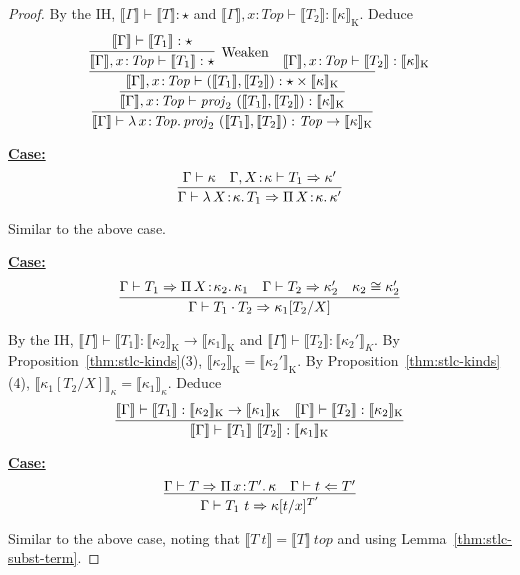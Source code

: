 \documentclass{article}
\newcommand{\abs}[4]{{#1}\, #2\! : \! #3.\, #4}
\newcommand{\interp}[1]{\llbracket #1 \rrbracket}
\newcommand{\tpcheck}[0]{\Leftarrow}
\newcommand{\tpsynth}[0]{\Rightarrow}
\newcommand{\startcase}[1]{\vspace{#1} \noindent\textbf{\underline{Case:}}}
\begin{document}
\begin{proof}
  By the IH,
  \(\interp{\Gamma} \vdash \interp{T} : \star\)
  and \(\interp{\Gamma},x\!:\!\mathit{Top} \vdash \interp{T_2} :
  \interp{\kappa}_{\text{K}}\).
  Deduce
  \[
    \infer{
      \interp{\Gamma}
      \vdash \abs{\lambda}{x}{\mathit{Top}}{\mathit{proj}_2\ (\interp{T_1},\interp{T_2})}
      : \mathit{Top} \to \interp{\kappa}_{\text{K}}
    }{
      \infer{
        \interp{\Gamma},x\!:\!\mathit{Top}
        \vdash \mathit{proj}_2\ (\interp{T_1},\interp{T_2})
        : \interp{\kappa}_{\text{K}}
      }{
        \infer{
          \interp{\Gamma},x\!:\!\mathit{Top}
          \vdash (\interp{T_1},\interp{T_2})
          : \star \times \interp{\kappa}_{\text{K}}
        }{
          \infer[\text{Weaken}]{
            \interp{\Gamma},x\!:\!\mathit{Top}
            \vdash \interp{T_1}
            : \star
          }{
            \interp{\Gamma}
            \vdash \interp{T_1}
            : \star
          }
            \quad
            \interp{\Gamma},x\!:\!\mathit{Top}
            \vdash \interp{T_2}
            : \interp{\kappa}_{\text{K}}
          }
        }
      }
  \]

  \startcase{.2cm}
  \[
    \infer{
      \Gamma \vdash \abs{\lambda}{X}{\kappa}{T_1} \tpsynth \abs{\Pi}{X}{\kappa}{\kappa'}
    }{
      \Gamma \vdash \kappa
      \quad \Gamma,X\!:\!\kappa \vdash T_1 \tpsynth \kappa'
    }
  \]

  Similar to the above case.

  \startcase{.2cm}
  \[
    \infer{
      \Gamma \vdash T_1 \cdot T_2 \tpsynth \kappa_1[T_2/X]
    }{
      \Gamma \vdash T_1 \tpsynth \abs{\Pi}{X}{\kappa_2}{\kappa_1}
      \quad \Gamma \vdash T_2 \tpsynth \kappa_2'
      \quad \kappa_2 \cong \kappa_2'
    }
  \]

  By the IH, \(\interp{\Gamma} \vdash \interp{T_1} : \interp{\kappa_2}_{\text{K}} \to
  \interp{\kappa_1}_{\text{K}}\)
  and \(\interp{\Gamma} \vdash \interp{T_2} : \interp{\kappa_2'}_{K}\).
  By Proposition~\ref{thm:stlc-kinds}(3), \(\interp{\kappa_2}_{\text{K}} =
  \interp{\kappa_2'}_{\text{K}}\).
  By Proposition~\ref{thm:stlc-kinds}(4), \(\interp{\kappa_1[T_2/X]}_{\kappa} =
  \interp{\kappa_1}_{\kappa}\).
  Deduce
  \[
    \infer{
      \interp{\Gamma} \vdash \interp{T_1}\ \interp{T_2} : \interp{\kappa_1}_{\text{K}}
    }{
      \interp{\Gamma} \vdash \interp{T_1} : \interp{\kappa_2}_{\text{K}} \to
      \interp{\kappa_1}_{\text{K}}
      \quad \interp{\Gamma} \vdash \interp{T_2} : \interp{\kappa_2}_{\text{K}}
    }
  \]

  \startcase{.2cm}
  \[
    \infer{
      \Gamma \vdash T_1\ t \tpsynth \kappa [t/x]^{T'}
    }{
      \Gamma \vdash T \tpsynth \abs{\Pi}{x}{T'}{\kappa}
      \quad \Gamma \vdash t \tpcheck T'
    }
  \]

  Similar to the above case, noting that \(\interp{T\ t} = \interp{T}\ \mathit{top}\) and using
  Lemma~\ref{thm:stlc-subst-term}.
\end{proof}
\end{document}

